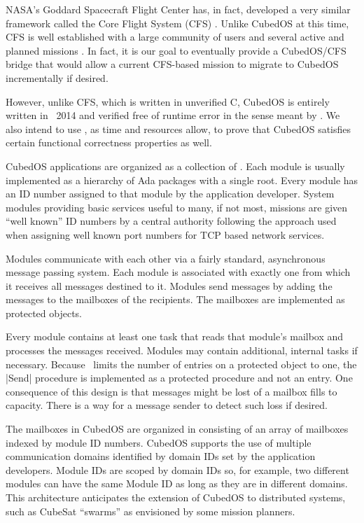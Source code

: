NASA's Goddard Spacecraft Flight Center has, in fact, developed a very similar framework called
the Core Flight System (CFS) . Unlike CubedOS at this time, CFS is well
established with a large community of users and several active and planned missions
. In fact, it is our goal to eventually provide a CubedOS/CFS bridge that
would allow a current CFS-based mission to migrate to CubedOS incrementally if desired.

However, unlike CFS, which is written in unverified C, CubedOS is entirely written in \SPARK\
2014 and verified free of runtime error in the sense meant by \SPARK.  We also
intend to use \SPARK, as time and resources allow, to prove that CubedOS satisfies certain
functional correctness properties as well.

CubedOS applications are organized as a collection of . Each module is usually
implemented as a hierarchy of Ada packages with a single root. Every module has an ID number
assigned to that module by the application developer. System modules providing basic services
useful to many, if not most, missions are given ``well known'' ID numbers by a central authority
following the approach used when assigning well known port numbers for TCP based network
services.

Modules communicate with each other via a fairly standard, asynchronous message passing system.
Each module is associated with exactly one \newterm{mailbox} from which it receives all messages
destined to it. Modules send messages by adding the messages to the mailboxes of the recipients.
The mailboxes are implemented as protected objects.

Every module contains at least one task that reads that module's mailbox and processes the
messages received. Modules may contain additional, internal tasks if necessary. Because \SPARK\
limits the number of entries on a protected object to one, the |Send| procedure is implemented
as a protected procedure and not an entry. One consequence of this design is that messages might
be lost of a mailbox fills to capacity. There is a way for a message sender to detect such loss
if desired.

The mailboxes in CubedOS are organized in  consisting of an array
of mailboxes indexed by module ID numbers. CubedOS supports the use of multiple communication
domains identified by domain IDs set by the application developers. Module IDs are scoped by
domain IDs so, for example, two different modules can have the same Module ID as long as they
are in different domains. This architecture anticipates the extension of CubedOS to distributed
systems, such as CubeSat ``swarms'' as envisioned by some mission planners.

